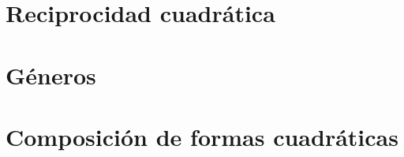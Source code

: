 
\section{Reciprocidad cuadr\'atica}\label{sec:motiva:reciprocidad}


\section{G\'eneros}\label{sec:motiva:generos}


\section{Composici\'on de formas cuadr\'aticas}\label{sec:motiva:composicion}


